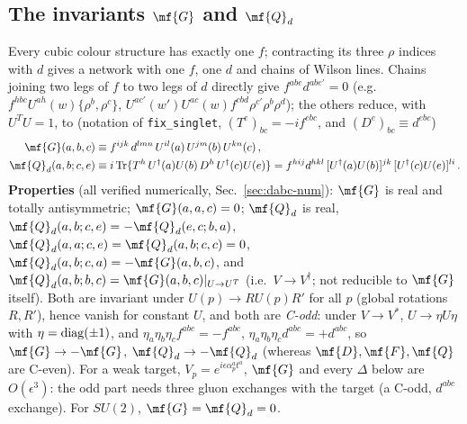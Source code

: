 \subsection{The invariants $\mf{G}$ and $\mf{Q}_{d}$}\label{sec:dabc-inv}
\noindent Every cubic colour structure has exactly one $f$; contracting its three $\rho$ indices with $d$ gives a network with one $f$, one $d$ and chains of Wilson lines. Chains joining two legs of $f$ to two legs of $d$ directly give $f^{abe}d^{abe'}=0$ (e.g.\ $f^{hbc}U^{ah}(w)\{\rho^{b},\rho^{c}\}$, $U^{ac'}(w')U^{ac}(w)f^{cbd}\rho^{c'}\rho^{b}\rho^{d}$); the others reduce, with $U^{T}U=1$, to (notation of \texttt{fix\_singlet}, $(T^{e})_{bc}=-if^{ebc}$, and $(D^{e})_{bc}\equiv d^{ebc}$)
\begin{align}
\mf{G}(a,b,c)&\equiv f^{ijk}\,d^{lmn}\,U^{il}(a)\,U^{jm}(b)\,U^{kn}(c)\,,\notag\\
\mf{Q}_{d}(a,b;c,e)&\equiv i\,{\rm Tr}\{T^{h}\,U^{\dagger}(a)U(b)\,D^{h}\,U^{\dagger}(c)U(e)\}=f^{hij}d^{hkl}\,[U^{\dagger}(a)U(b)]^{jk}\,[U^{\dagger}(c)U(e)]^{li}\,.\label{eq:dabc-GQ}
\end{align}
\textbf{Properties} (all verified numerically, Sec.~\ref{sec:dabc-num}): $\mf{G}$ is real and totally antisymmetric; $\mf{G}(a,a,c)=0$; $\mf{Q}_{d}$ is real, $\mf{Q}_{d}(a,b;c,e)=-\mf{Q}_{d}(e,c;b,a)$, $\mf{Q}_{d}(a,a;c,e)=\mf{Q}_{d}(a,b;c,c)=0$, $\mf{Q}_{d}(a,b;c,a)=-\mf{G}(a,b,c)$, and $\mf{Q}_{d}(a,b;b,c)=\mf{G}(a,b,c)|_{U\to U^{T}}$ (i.e.\ $V\to V^{\dagger}$; not reducible to $\mf{G}$ itself). Both are invariant under $U(p)\to RU(p)R'$ for all $p$ (global rotations $R,R'$), hence vanish for constant $U$, and both are \emph{C-odd}: under $V\to V^{*}$, $U\to\eta U\eta$ with $\eta={\rm diag}(\pm1)$, and $\eta_{a}\eta_{b}\eta_{c}f^{abc}=-f^{abc}$, $\eta_{a}\eta_{b}\eta_{c}d^{abc}=+d^{abc}$, so $\mf{G}\to-\mf{G}$, $\mf{Q}_{d}\to-\mf{Q}_{d}$ (whereas $\mf{D},\mf{F},\mf{Q}$ are C-even). For a weak target, $V_{p}=e^{i\epsilon\alpha_{p}^{a}t^{a}}$, $\mf{G}$ and every $\Delta$ below are $O(\epsilon^{3})$: the odd part needs three gluon exchanges with the target (a C-odd, $d^{abc}$ exchange). For $SU(2)$, $\mf{G}=\mf{Q}_{d}=0$.


